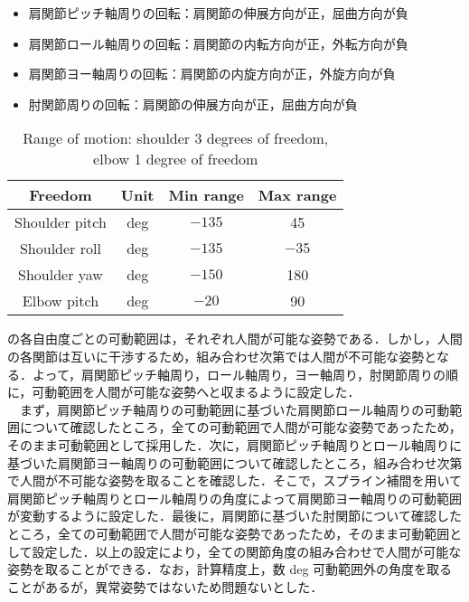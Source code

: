\begin{itemize}
  \item 肩関節ピッチ軸周りの回転：肩関節の伸展方向が正，屈曲方向が負
  \item 肩関節ロール軸周りの回転：肩関節の内転方向が正，外転方向が負
  \item 肩関節ヨー軸周りの回転：肩関節の内旋方向が正，外旋方向が負
  \item 肘関節周りの回転：肩関節の伸展方向が正，屈曲方向が負
\end{itemize}


\begin{table}[tb]
  \begin{center}
    \caption{Range of motion: shoulder 3 degrees of freedom, elbow 1 degree of freedom}
    \begin{tabular}{c|c|c|c}
      \hline
      Freedom & Unit & Min range & Max range \\
      \hline
      Shoulder pitch & deg & $-135$ & 45 \\
      Shoulder roll & deg & $-135$ & $-35$ \\
      Shoulder yaw & deg & $-150$ & 180 \\
      Elbow pitch & deg & $-20$ & 90 \\
      \hline
    \end{tabular}
  \end{center}
\end{table}

の各自由度ごとの可動範囲は，それぞれ人間が可能な姿勢である．しかし，人間の各関節は互いに干渉するため，組み合わせ次第では人間が不可能な姿勢となる．よって，肩関節ピッチ軸周り，ロール軸周り，ヨー軸周り，肘関節周りの順に，可動範囲を人間が可能な姿勢へと収まるように設定した．\\
　まず，肩関節ピッチ軸周りの可動範囲に基づいた肩関節ロール軸周りの可動範囲について確認したところ，全ての可動範囲で人間が可能な姿勢であったため，そのまま可動範囲として採用した．次に，肩関節ピッチ軸周りとロール軸周りに基づいた肩関節ヨー軸周りの可動範囲について確認したところ，組み合わせ次第で人間が不可能な姿勢を取ることを確認した．そこで，スプライン補間\cite{spline}を用いて肩関節ピッチ軸周りとロール軸周りの角度によって肩関節ヨー軸周りの可動範囲が変動するように設定した．最後に，肩関節に基づいた肘関節について確認したところ，全ての可動範囲で人間が可能な姿勢であったため，そのまま可動範囲として設定した．以上の設定により，全ての関節角度の組み合わせで人間が可能な姿勢を取ることができる．なお，計算精度上，数 deg 可動範囲外の角度を取ることがあるが，異常姿勢ではないため問題ないとした．


